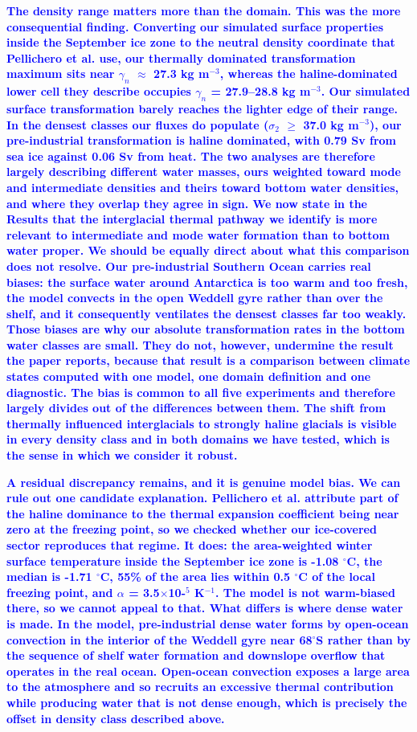 \documentclass[pdflatex,sn-nature]{sn-jnl}
\begin{document}
\noindent\textcolor{blue}{\textbf{\textbf{The density range matters more than the domain.} This was the more consequential finding. Converting our simulated surface properties inside the September ice zone to the neutral density coordinate that Pellichero et al. use, our thermally dominated transformation maximum sits near $\gamma_n$ $\approx$ 27.3 kg m$^{-3}$, whereas the haline-dominated lower cell they describe occupies $\gamma_n$ = 27.9--28.8 kg m$^{-3}$. Our simulated surface transformation barely reaches the lighter edge of their range. In the densest classes our fluxes do populate ($\sigma$$_2$ $\ge$ 37.0 kg m$^{-3}$), our pre-industrial transformation is haline dominated, with 0.79 Sv from sea ice against 0.06 Sv from heat. The two analyses are therefore largely describing different water masses, ours weighted toward mode and intermediate densities and theirs toward bottom water densities, and where they overlap they agree in sign. We now state in the Results that the interglacial thermal pathway we identify is more relevant to intermediate and mode water formation than to bottom water proper. We should be equally direct about what this comparison does not resolve. Our pre-industrial Southern Ocean carries real biases: the surface water around Antarctica is too warm and too fresh, the model convects in the open Weddell gyre rather than over the shelf, and it consequently ventilates the densest classes far too weakly. Those biases are why our absolute transformation rates in the bottom water classes are small. They do not, however, undermine the result the paper reports, because that result is a comparison between climate states computed with one model, one domain definition and one diagnostic. The bias is common to all five experiments and therefore largely divides out of the differences between them. The shift from thermally influenced interglacials to strongly haline glacials is visible in every density class and in both domains we have tested, which is the sense in which we consider it robust.}}


\noindent\textcolor{blue}{\textbf{\textbf{A residual discrepancy remains, and it is genuine model bias.} We can rule out one candidate explanation. Pellichero et al. attribute part of the haline dominance to the thermal expansion coefficient being near zero at the freezing point, so we checked whether our ice-covered sector reproduces that regime. It does: the area-weighted winter surface temperature inside the September ice zone is -1.08 $^\circ$C, the median is -1.71 $^\circ$C, 55\% of the area lies within 0.5 $^\circ$C of the local freezing point, and $\alpha$ = 3.5$\times$10-$^5$ K$^{-1}$. The model is not warm-biased there, so we cannot appeal to that. What differs is where dense water is made. In the model, pre-industrial dense water forms by open-ocean convection in the interior of the Weddell gyre near 68$^\circ$S rather than by the sequence of shelf water formation and downslope overflow that operates in the real ocean. Open-ocean convection exposes a large area to the atmosphere and so recruits an excessive thermal contribution while producing water that is not dense enough, which is precisely the offset in density class described above.}}
\end{document}
